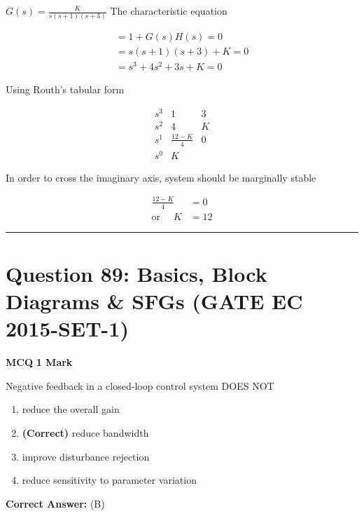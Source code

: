 \documentclass[11pt,a4paper]{article}
\begin{document}
\begin{tcolorbox}[solbox, title=Detailed Solution -- Question 88]
$G(s)=\frac{K}{s(s+1)(s+3)}$
 The characteristic equation

\[
\begin{array}{l} =1+G(s) H(s)=0 \\ =s(s+1)(s+3)+K=0 \\ =s^{3}+4 s^{2}+3 s+K=0 \end{array}
\]

 Using Routh's tabular form

\[
\begin{array}{c|cc} s^{3} & 1 & 3 \\ s^{2} & 4 & K \\ s^{1} & \frac{12-K}{4} & 0 \\ s^{0} & K & \end{array}
\]

 In order to cross the imaginary axis, system 
 should be marginally stable

\[
\begin{aligned} \frac{12-K}{4}&=0\\ \text{or }\quad K&=12 \end{aligned}
\]
\end{tcolorbox}

\vspace{1.5em}
\hrule
\vspace{1.5em}

\section*{Question 89: Basics, Block Diagrams \& SFGs (GATE EC 2015-SET-1)}
\noindent \textbf{\color{primary}MCQ} \hfill \textbf{\color{secondary}1 Mark}


\noindent Negative feedback in a closed-loop control system DOES NOT


\begin{enumerate}[label=(\Alph*)]
    \item reduce the overall gain
    \item \textbf{(Correct)} reduce bandwidth
    \item improve disturbance rejection
    \item reduce sensitivity to parameter variation
\end{enumerate}

\noindent \textbf{Correct Answer:} (B)
\end{document}
